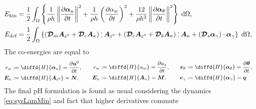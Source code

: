 \begin{equation*}
\begin{aligned}
E_{\text{kin}} &= \energy{\frac{1}{\rho h} \norm{\diffp{\bm{\alpha}_u}{t}}^2 + \frac{1}{\rho h} \left(\diffp{\alpha_w}{t}\right)^2 + \frac{12}{\rho h^3} \norm{\diffp{\bm{\alpha}_\theta}{t}}^2}, \\
E_{\text{def}} &= \energy{(\bm{\mathcal{D}}_m \bm{A}_{\varepsilon^0} + \bm{\mathcal{D}}_c \bm{A}_{\kappa}) \cddot \bm{A}_{\varepsilon^0} + (\bm{\mathcal{D}}_c \bm{A}_{\varepsilon^0} + \bm{\mathcal{D}}_b \bm{A}_{\kappa}) \cddot \bm{A}_{\kappa} + (\bm{\mathcal{D}}_s \bm{\alpha}_{\gamma}) \cdot \bm{\alpha}_{\gamma}}, 
\end{aligned}
\end{equation*}
The co-energies are equal to
\begin{equation}
\begin{aligned}
e_w &:= \diffd{H}{\bm\alpha_u} = \diffp{\bm{u}^0}{t},\\
\bm{E}_{\kappa} &:= \diffd{H}{\bm{A}_{\varepsilon^0}} = \bm{N},\\
\end{aligned} \qquad
\begin{aligned}
e_w &:= \diffd{H}{\alpha_w} = \diffp{u_z}{t}, \\
\bm{E}_{\kappa} &:= \diffd{H}{\bm{A}_{\kappa}} = \bm{M}, \\
\end{aligned} \qquad
\begin{aligned}
\bm{e}_{\theta} &:= \diffd{H}{\bm\alpha_{\theta}} = \diffp{\bm{\theta}}{t}, \\
\bm{e}_{\gamma} &:= \diffd{H}{\bm\alpha_\gamma} = \bm{q}  \\
\end{aligned}
\end{equation}
The final pH formulation is found as usual considering the dynamics \eqref{eq:sysLamMin} and fact that higher derivatives commute
